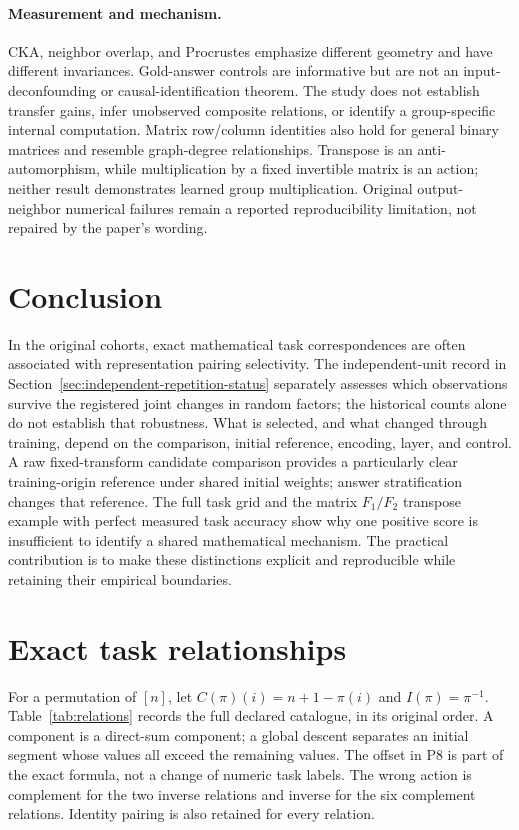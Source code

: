 \documentclass[10pt]{article}
\begin{document}
\paragraph{Measurement and mechanism.}
CKA, neighbor overlap, and Procrustes emphasize different geometry and have
different invariances. Gold-answer controls are informative but are not an
input-deconfounding or causal-identification theorem. The study does not
establish transfer gains, infer unobserved composite relations, or identify
a group-specific internal computation. Matrix row/column identities also
hold for general binary matrices and resemble graph-degree relationships.
Transpose is an anti-automorphism, while multiplication by a fixed
invertible matrix is an action; neither result demonstrates learned group
multiplication. Original output-neighbor numerical failures remain a
reported reproducibility limitation, not repaired by the paper's wording.

\section{Conclusion}
In the original cohorts, exact mathematical task correspondences are often
associated with representation pairing selectivity. The independent-unit
record in Section~\ref{sec:independent-repetition-status} separately assesses
which observations survive the registered joint changes in random factors;
the historical counts alone do not establish that robustness. What is
selected, and what changed through training, depend on the comparison,
initial reference, encoding, layer, and control. A raw fixed-transform
candidate comparison provides a particularly clear training-origin
reference under shared initial weights; answer stratification changes that
reference. The full task grid and the matrix $F_1/F_2$ transpose example
with perfect measured task accuracy show why
one positive score is insufficient to identify a shared mathematical
mechanism. The practical contribution is to make these distinctions explicit
and reproducible while retaining their empirical boundaries.




\appendix
\section{Exact task relationships}
\label{app:relations}
For a permutation of $[n]$, let $C(\pi)(i)=n+1-\pi(i)$ and
$I(\pi)=\pi^{-1}$. Table~\ref{tab:relations} records the full declared
catalogue, in its original order. A component is a direct-sum component;
a global descent separates an initial segment whose values all exceed the
remaining values. The offset in P8 is part of the exact formula, not a
change of numeric task labels. The wrong action is complement for the two
inverse relations and inverse for the six complement relations. Identity
pairing is also retained for every relation.
\end{document}
